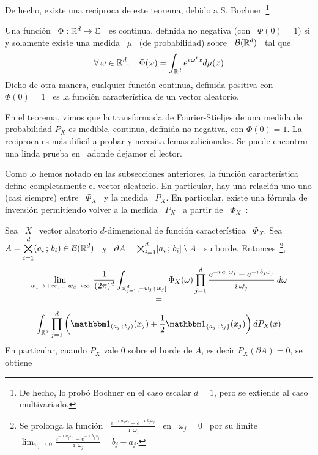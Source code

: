 {De hecho, existe una reciproca de este teorema, debido a S. Bochner~\footnote{De
  hecho, lo prob\'o Bochner en el caso escalar $d = 1$, pero se extiende al caso
  multivariado.}~\cite{Boc32, Boc59, Gol61, Pin09, Sas13}
%
\begin{teorema}[Bochner]\label{Teo:MP:Bochner}
%
  Una funci\'on \ $\Phi: \mathbb{R}^d \mapsto \mathbb{C}$ \ es continua, definida no negativa
  (con  \ $\Phi(0)  =  1$)  si y  solamente  existe una  medida  \  $\mu$ \  (de
  probabilidad) sobre \ $\mathcal{B}(\mathbb{R}^d)$ \ tal que
  \[
  \forall \:  \omega \in \mathbb{R}^d, \quad \Phi(\omega)  = \int_{\mathbb{R}^d} e^{\imath
    \, \omega^t x} d\mu(x)
  \]
  Dicho de  otra manera, cualquier  funci\'on continua, definida positiva  con \
  $\Phi(0) = 1$ \ es la funci\'on caracter\'istica de un vector aleatorio.
\end{teorema}
%
En el  teorema, vimos que la  transformada de Fourier-Stieljes de  una medida de
probabilidad $P_X$  es medible, continua,  definida no negativa, con  $\Phi(0) =
1$. La  reciproca es  m\'as dificil  a probar y  necesita lemas  adicionales. Se
puede  encontrar una  linda prueba  en~\cite[Sec.~1.7]{Sas13} adonde  dejamor el
lector.

Como   lo  hemos   notado   en  las   subsecciones   anteriores,  la   funci\'on
caracter\'istica define  completamente el  vector aleatorio. En  particular, hay
una relaci\'on uno-uno (casi siempre) entre \ $\Phi_X$ \ y la medida \ $P_X$. En
particular, existe una f\'ormula de inversi\'on permitiendo volver a la medida \
$P_X$ \ a partir de \ $\Phi_X$~\cite{AshDol99, Sas13}:
%
\begin{teorema}\label{Teo:MP:InversionFourierStieljes}
%
  Sea \ $X$  \ vector aleatorio $d$-dimensional de  funci\'on caracter\'istica \
  $\Phi_X$.   Sea  \  $\displaystyle  A  = \operatorname*{\bigtimes}_{i=1}^d  (a_i  \, ; \,  b_i)  \in
  \mathcal{B}(\mathbb{R}^d)$ \ y \ $\partial A  = \operatorname*{\bigtimes}_{i=1}^d [a_i \, ; \, b_i] \setminus A$ \
  su borde. Entonces~\footnote{Se prolonga  la funci\'on \ $\frac{e^{- \imath \,
        a_j \omega_j} - e^{- \imath  \, b_j \omega_j}}{\imath \, \omega_j}$ \ en
    \ $\omega_j  = 0$ \ por  su l\'imite \ $\displaystyle  \lim_{\omega_j \to 0}
    \frac{e^{- \imath \, a_j \omega_j} - e^{- \imath \, b_j \omega_j}}{\imath \,
      \omega_j} = b_j - a_j$.},
  \[
  \begin{array}{c}
  \displaystyle \lim_{w_1 \to +\infty,\ldots, w_d \to \infty} \: \frac{1}{(2
  \pi)^d} \int_{\optimes_{j=1}^d [-w_j \; w_j]} \Phi_X(\omega) \prod_{j = 1}^d
  \frac{e^{- \imath \, a_j \omega_j} - e^{- \imath \, b_j \omega_j}}{\imath \,
  \omega_j} \: d\omega\\[2.5mm]
  =\\[2.5mm]
   \displaystyle \int_{\Rset^d} \prod_{j=1}^d \left(
     \un_{\left(  a_j \;  b_j \right)}(x_j)  +  \frac12 \un_{\left\{  a_j \;  b_j
       \right\}}(x_j) \right) dP_X(x)
  \end{array}
  \]
  En particular, cuando $P_X$ vale 0  sobre el borde de $A$, es decir $P_X\left(
  \partial A \right) = 0$, se obtiene


\end{teorema}}
